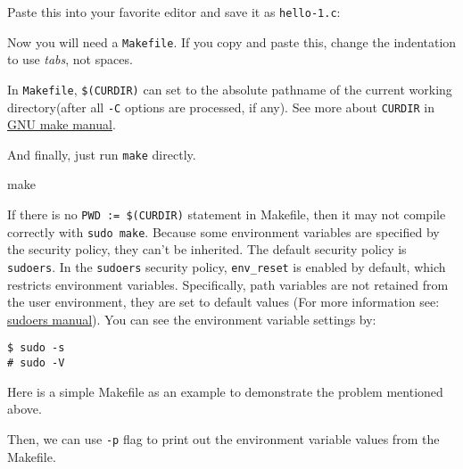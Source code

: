 \documentclass[10pt, oneside]{book}
\begin{document}
Paste this into your favorite editor and save it as \verb|hello-1.c|:


Now you will need a \verb|Makefile|. If you copy and paste this, change the indentation to use \textit{tabs}, not spaces.


In \verb|Makefile|, \verb|$(CURDIR)| can set to the absolute pathname of the current working directory(after all \verb|-C| options are processed, if any). 
See more about \verb|CURDIR| in \href{https://www.gnu.org/software/make/manual/make.html}{GNU make manual}.

And finally, just run \verb|make| directly.

\begin{codebash}
make
\end{codebash}

If there is no \verb|PWD := $(CURDIR)| statement in Makefile, then it may not compile correctly with \verb|sudo make|.
Because some environment variables are specified by the security policy, they can't be inherited.
The default security policy is \verb|sudoers|.
In the \verb|sudoers| security policy, \verb|env_reset| is enabled by default, which restricts environment variables. 
Specifically, path variables are not retained from the user environment, they are set to default values (For more information see: \href{https://www.sudo.ws/docs/man/sudoers.man/}{sudoers manual}).
You can see the environment variable settings by:

\begin{verbatim}
$ sudo -s
# sudo -V
\end{verbatim}

Here is a simple Makefile as an example to demonstrate the problem mentioned above.


Then, we can use \verb|-p| flag to print out the environment variable values from the Makefile.
\end{document}
